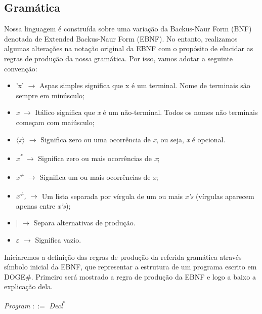 \documentclass{scrreprt}
\begin{document}
\subsection{Gramática}
\par Nossa linguagem é construída sobre uma variação da Backus-Naur Form (BNF) denotada de Extended Backus-Naur Form (EBNF). No entanto, realizamos algumas alterações na notação original da EBNF com o propósito de elucidar as regras de produção da  nossa gramática. Por isso, vamos adotar a seguinte convenção:
\begin{itemize}
\item 'x' $\rightarrow$ Aspas simples significa que x é um terminal. Nome de terminais são sempre em minúsculo;
  
\item \textit{x} $\rightarrow$ Itálico significa que \textit{x} é um não-terminal. Todos os nomes não terminais começam com maiúsculo;

\item $\langle$\textit{x}$\rangle$ $\rightarrow$ Significa zero ou uma ocorrência de \textit{x}, ou seja, \textit{x} é opcional.
  
\item \textit{x\textsuperscript{*}} $\rightarrow$ Significa zero ou mais ocorrências de \textit{x};
  
\item \textit{x\textsuperscript{+}} $\rightarrow$ Significa um ou mais ocorrências de \textit{x};
  
\item \textit{x\textsuperscript{+},} $\rightarrow$ Um lista separada por vírgula de um ou mais \textit{x's} (vírgulas aparecem apenas entre \textit{x's});
  
\item  | $\rightarrow$ Separa alternativas de produção.

\item $\varepsilon$ $\rightarrow$ Significa vazio.
  
\end{itemize}

\par Iniciaremos a definição das regras de produção da referida gramática através símbolo inicial da EBNF, que representar a estrutura de um programa escrito em DOGE\#. Primeiro será mostrado a regra de produção da EBNF e logo a baixo a explicação dela.

\begin{center}
\textit{Program }$::=$\textit{ Decl}\textsuperscript{*}
\end{center}
\end{document}
